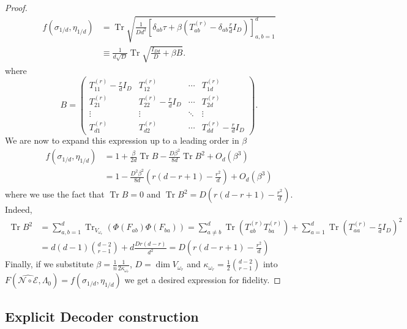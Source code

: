 \documentclass[10pt,twocolumn,superscriptaddress,aps,amsmath,amssymb,citeautoscript,floatfix,prx]{revtex4-2}
\theoremstyle{plain}
\theoremstyle{plain}
\theoremstyle{plain}
\theoremstyle{plain}
\theoremstyle{plain}
\theoremstyle{plain}
\theoremstyle{plain}
\theoremstyle{definition}
\theoremstyle{plain}
\begin{document}
\begin{appendix}
\begin{proof}
\[\begin{aligned}
    f\left(\sigma_{1/d}, \eta_{1/d}\right)&=\operatorname{Tr} \sqrt{\frac{1}{Dd^2}\left[\delta_{a b} \tau+\beta \left(T_{a b}^{(r)}-
    \delta_{a b} \frac{r}{d} I_D\right)\right]_{a, b=1}^d}\\&\equiv\frac{1}{d \sqrt{D}} \operatorname{Tr} \sqrt{\frac{I_{D d}}{D}+\beta B} .
\end{aligned}
\]
where 
\[
    B=\left(\begin{array}{cccc}
    T_{11}^{(r)}-\frac{r}{d} I_D & T_{12}^{(r)} & \cdots & T_{1 d}^{(r)} \\
    T_{21}^{(r)} & T_{22}^{(r)}-\frac{r}{d} I_D & \cdots & T_{2 d}^{(r)} \\
    \vdots & \vdots & \ddots & \vdots \\
    T_{d 1}^{(r)} & T_{d 2}^{(r)} & \cdots & T_{d d}^{(r)}-\frac{r}{d} I_D
    \end{array}\right).
\]
We are now to expand this expression up to a leading order in $\beta$
\[
\begin{aligned}
        f\left(\sigma_{1/d}, \eta_{1/d}\right)&=1+\frac{\beta}{2 d} \operatorname{Tr} B-\frac{D \beta^2}{8 d} \operatorname{Tr} B^2+O_{d}\left(\beta^3\right)
        \\&=1-\frac{D^2 \beta^2}{8 d}\left(r(d-r+1)-\frac{r^2}{d}\right)+O_{d}\left(\beta^3\right)
\end{aligned}
\]
where we use the fact that $\operatorname{Tr} B=0$ and $\operatorname{Tr} B^2=D\left(r(d-r+1)-\frac{r^2}{d}\right)$. Indeed, 
$$
\begin{aligned}
    \operatorname{Tr} B^2&=\sum_{a, b=1}^d \operatorname{Tr}_{V_{\omega_r}}\left(\Phi\left(F_{a b}\right) \Phi\left(F_{b a}\right)\right)=\sum_{a\neq b}^d\operatorname{Tr}\left(T_{a b}^{(r)} T_{b a}^{(r)}\right)+\sum_{a=1}^d \operatorname{Tr}\left(T_{a a}^{(r)}-\frac{r}{d} I_D\right)^2\\&=d(d-1)\binom{d-2}{r-1}+d\frac{Dr(d-r)}{d^2}=D\left(r(d-r+1)-\frac{r^2}{d}\right)
\end{aligned}
$$
Finally, if we substitute $\beta=\frac{1}{n} \frac{1}{2\kappa_{\omega_r}}$, $D=\operatorname{dim} V_{\omega_r}$ and 
$\kappa_{\omega_r}=\frac{1}{2}\binom{d-2}{r-1}$ into $F(\widehat{\mathcal{N} \circ \mathcal{E}}, \Lambda_0)=f(\sigma_{1/d}, \eta_{1/d
})$ we get a desired expression for fidelity.
\end{proof}

\subsection{Explicit Decoder construction}\label{subsec:supple_decoder}


\end{appendix}
\end{document}
